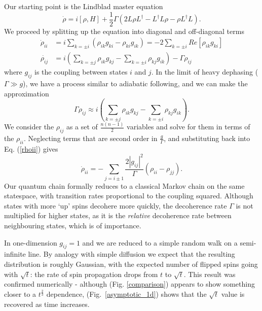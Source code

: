 Our starting point is the Lindblad master equation
\begin{equation}
  \dot{\rho}=i\left[\rho,H\right]+\frac{1}{2}\Gamma\left(2L\rho
  L^{\dagger}-L^{\dagger}L\rho-\rho L^{\dagger}L\right).
\end{equation}
We proceed by splitting up the equation into diagonal and off-diagonal terms
\begin{align}
  \dot{\rho}_{ii} & = i\sum_{k=\pm i}\left(\rho_{ik}g_{ki}-\rho_{ki}g_{ik}\right)=-2\sum_{k=\pm i}Re\left[\rho_{ik}g_{ki}\right] \label{rhoii}\\
  \dot{\rho_{ij}} & = i\left(\sum_{k=\pm j}\rho_{ik}g_{kj}-\sum_{k=\pm i}\rho_{kj}g_{ik}\right)-\Gamma\rho_{ij}
\end{align}
where $g_{ij}$ is the coupling between states $i$ and $j$. In the limit of heavy dephasing ($\Gamma\gg g$), we have a process similar to adiabatic following, and we can make the approximation\[ \Gamma\rho_{ij}\approx i\left(\sum_{k=\pm j}\rho_{ik}g_{kj}-\sum_{k=\pm i}\rho_{kj}g_{ik}\right).\] We consider the $\rho_{ij}$ as a set of $\frac{n(n-1)}{2}$ variables and solve for them in terms of the $\rho_{ii}$. Neglecting terms that are second order in $\frac{g}{\Gamma}$, and substituting back into Eq. (\ref{rhoii}) gives \[ \dot{\rho}_{ii}=-\sum_{j=i\pm1}\frac{2|g_{ij}|^{2}}{\Gamma}\left(\rho_{ii}-\rho_{jj}\right).\]
Our quantum chain formally reduces to a classical Markov chain on the same statespace, with transition rates proportional to the coupling squared.  Although states with more `up' spins decohere more quickly, the decoherence rate $\Gamma$ is not multiplied for higher states, as it is the \textit{relative} decoherence rate between neighbouring states, which is of importance.

In one-dimension $g_{ij} = 1$ and we are reduced to a simple random walk on a semi-infinite line. By analogy with simple diffusion we expect that the resulting distribution is roughly Gaussian, with the expected number of flipped spins going with $\sqrt{t}$: the rate of spin propagation drops from $t$ to $\sqrt{t}$. This result was confirmed numerically - although (Fig. \ref{comparison}) appears to show something closer to a $t^\frac{2}{3}$ dependence, (Fig.~\ref{asymptotic_1d}) shows that the $\sqrt{t}$ value is recovered as time increases.


